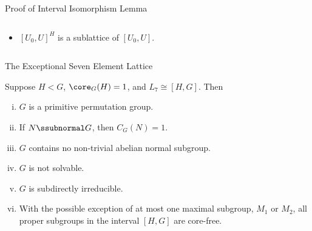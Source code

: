 \begin{frame}[fragile,label=ProofOfIntervalIsomorphism,shrink=5]{Proof of Interval Isomorphism Lemma}
\begin{columns}
\begin{column}{0.7\textwidth}
\begin{itemize}
      \item<6-> $[U_0, U]^H$ is a sublattice of $[U_0,U]$.

      \end{itemize}
    \end{column}
  \end{columns}

\end{frame}





\begin{frame}[fragile,label=L7second]{The Exceptional Seven Element Lattice}
  \begin{center}
    {
      \begin{tikzpicture}[scale=.7]
        
      \end{tikzpicture}
    }
  \end{center}

\begin{theorem}
\label{thm:except-seven-elem}
Suppose $H<G$, $\core_G(H) = 1$, and 
$L_7 \cong [H,G]$.  Then
\begin{enumerate}[(i)]
\item<1-> $G$ is a primitive permutation group.
\item<1-> If $N\ssubnormal G$, then $C_G(N) = 1$.
\item<1-> $G$ contains no non-trivial abelian normal subgroup.
\item<1-> $G$ is not solvable.
\item<1-> $G$ is subdirectly irreducible.
\item<1-> With the possible exception of at most one maximal subgroup, $M_1$ or $M_2$,
  all proper subgroups in the interval $[H,G]$ are core-free. 

\end{enumerate}
\end{theorem}
\end{frame}

